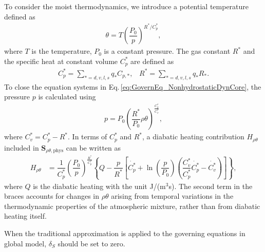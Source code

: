 To consider the moist thermodynamics, 
we introduce a potential temperature defined as 
\begin{align}
  \theta = T \left(\dfrac{P_0}{p}\right)^{R^*/C_p^*}, 
\end{align}
where 
$T$ is the temperature, 
$P_0$ is a constant pressure. 
The gas constant $R^*$ and 
the specific heat at constant volume $C_p^*$ are defined as 
\begin{align}
  C_p^* = \sum_{*=d,v,l,s} q_{*} C_{p,*}, \;\;\;
  R^* = \sum_{*=d,v,l,s} q_{*} R_{*}. 
\end{align}
To close the equation systems in Eq.\,\eqref{eq:GovernEq_NonhydrostaticDynCore}, 
the pressure $p$ is calculated using
\begin{align}
    p=P_0 \left(\dfrac{R^*}{P_0} \rho \theta  \right)^{\frac{C_{p}^*}{C_{v}^*}}, 
\end{align}
where $C_v^* = C_p^* - R^*$.  
In terms of $C_p^*$ and $R^*$, 
a diabatic heating contribution $H_{\rho \theta}$ included in $\bm{S}_{\rho \theta,\textrm{phys}}$ can be written as
\begin{align}
  H_{\rho \theta} &= \dfrac{1}{C_p^*} \left(\dfrac{P_0}{p}\right)^{\frac{R^*}{C_p^*}} 
    \left\{ Q - \dfrac{p}{R^*} \left[ \dot{C_p^*} + \ln{\left(\dfrac{p}{P_0}\right)} \left(\dfrac{C_v^*}{C_p^*}\dot{C_p^*} - \dot{C_v^*} \right) \right] \right\},
\label{eq:diabatic_heating}
\end{align}
where $Q$ is the diabatic heating with the unit J/(m$^3$s).
The second term in the braces accounts for changes in $\rho\theta$ arising from temporal variations in the thermodynamic properties of the atmospheric mixture, 
rather than from diabatic heating itself.


When the traditional approximation is applied to the governing equations in global model, 
$\delta_S$ should be set to zero.

